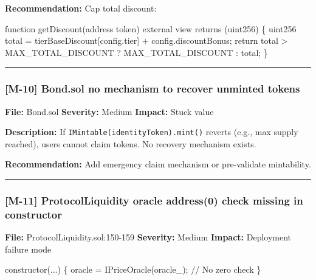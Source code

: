 \documentclass[
]{article}
\newenvironment{Shaded}{}{}
\newcommand{\NormalTok}[1]{#1}
\begin{document}
\textbf{Recommendation:} Cap total discount:

\begin{Shaded}
\begin{Highlighting}[]
\NormalTok{function getDiscount(address token) external view returns (uint256) \{}
\NormalTok{    uint256 total = tierBaseDiscount[config.tier] + config.discountBonus;}
\NormalTok{    return total \textgreater{} MAX\_TOTAL\_DISCOUNT ? MAX\_TOTAL\_DISCOUNT : total;}
\NormalTok{\}}
\end{Highlighting}
\end{Shaded}

\begin{center}\rule{0.5\linewidth}{0.5pt}\end{center}

\subsubsection{{[}M-10{]} Bond.sol no mechanism to recover unminted
tokens}\label{m-10-bondsol-no-mechanism-to-recover-unminted-tokens}

\textbf{File:} Bond.sol \textbf{Severity:} Medium \textbf{Impact:} Stuck
value

\textbf{Description:} If \texttt{IMintable(identityToken).mint()}
reverts (e.g., max supply reached), users cannot claim tokens. No
recovery mechanism exists.

\textbf{Recommendation:} Add emergency claim mechanism or pre-validate
mintability.

\begin{center}\rule{0.5\linewidth}{0.5pt}\end{center}

\subsubsection{{[}M-11{]} ProtocolLiquidity oracle address(0) check
missing in
constructor}\label{m-11-protocolliquidity-oracle-address0-check-missing-in-constructor}

\textbf{File:} ProtocolLiquidity.sol:150-159 \textbf{Severity:} Medium
\textbf{Impact:} Deployment failure mode

\begin{Shaded}
\begin{Highlighting}[]
\NormalTok{constructor(...) \{}
\NormalTok{    oracle = IPriceOracle(oracle\_);  // No zero check}
\NormalTok{\}}
\end{Highlighting}
\end{Shaded}
\end{document}

